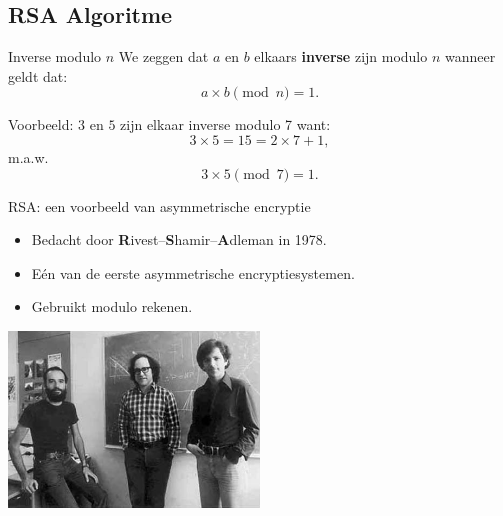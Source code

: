 \documentclass{beamer}
\begin{document}




\subsection{RSA Algoritme}
\sectionframe

%	
%	
%	

\begin{frame}{Inverse modulo $n$}
We zeggen dat $a$ en $b$ elkaars \textbf{inverse} zijn modulo $n$ wanneer geldt dat:
\[
a \times b \pmod{n} = 1.
\]

\vspace{0.5cm}
Voorbeeld: $3$ en $5$ zijn elkaar inverse modulo 7 want:
\[
3 \times 5 = 15 = 2\times 7 + 1,
\]
m.a.w.
\[
3 \times 5  \pmod{7} = 1.
\]
\end{frame}

\begin{frame}{RSA: een voorbeeld van asymmetrische encryptie}
\begin{itemize}
	\item Bedacht door \textbf{R}ivest–\textbf{S}hamir–\textbf{A}dleman in 1978.
	\item E\'en van de eerste asymmetrische encryptiesystemen.
	\item Gebruikt modulo rekenen.
\end{itemize}

\begin{center}
\includegraphics[width=0.5\textwidth]{img/rivest-shamir-adleman.jpg}
\end{center}
\end{frame}
\end{document}
